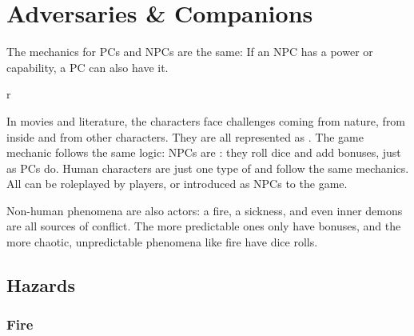 \chapterspaceabove{6.75cm}
\chapterspacebelow{11.25cm}


\chapter{Adversaries \& Companions}

\begin{emphasisParagraph}
	The mechanics for PCs and NPCs are the same: If an NPC has a power or capability,
	a PC can also have it.
\end{emphasisParagraph}


\begin{wrapfigure}{r}{}
\end{wrapfigure}


In movies and literature, the characters face challenges coming from nature, from inside and from other characters.
They are all represented as . The game mechanic follows the same logic:
NPCs are : they roll dice and add bonuses, just as PCs do.
Human characters are just one type of  and follow the same mechanics.
All  can be roleplayed by players, or introduced as NPCs to the game.

Non-human phenomena are also actors: a fire, a sickness, and even inner demons are all
sources of conflict. The more predictable ones only have bonuses, and the more
chaotic, unpredictable phenomena like fire have dice rolls.


\section{Hazards}

\subsection{Fire}

